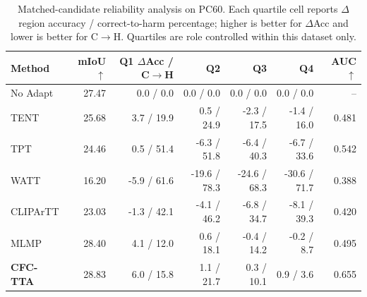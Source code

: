 \begin{table}[t]
\centering
\scriptsize
\setlength{\tabcolsep}{3.2pt}
\caption{Matched-candidate reliability analysis on PC60. Each quartile cell reports $\Delta$ region accuracy / correct-to-harm percentage; higher is better for $\Delta$Acc and lower is better for C$\rightarrow$H. Quartiles are role controlled within this dataset only.}
\label{tab:source-risk-pc60}
\begin{tabular}{lrrrrrr}
\toprule
Method & mIoU $\uparrow$ & Q1 $\Delta$Acc / C$\rightarrow$H & Q2 & Q3 & Q4 & AUC $\uparrow$ \\
\midrule
No Adapt & 27.47 & 0.0 / 0.0 & 0.0 / 0.0 & 0.0 / 0.0 & 0.0 / 0.0 & -- \\
TENT & 25.68 & 3.7 / 19.9 & 0.5 / 24.9 & -2.3 / 17.5 & -1.4 / 16.0 & 0.481 \\
TPT & 24.46 & 0.5 / 51.4 & -6.3 / 51.8 & -6.4 / 40.3 & -6.7 / 33.6 & 0.542 \\
WATT & 16.20 & -5.9 / 61.6 & -19.6 / 78.3 & -24.6 / 68.3 & -30.6 / 71.7 & 0.388 \\
CLIPArTT & 23.03 & -1.3 / 42.1 & -4.1 / 46.2 & -6.8 / 34.7 & -8.1 / 39.3 & 0.420 \\
MLMP & 28.40 & 4.1 / 12.0 & 0.6 / 18.1 & -0.4 / 14.2 & -0.2 / 8.7 & 0.495 \\
\textbf{CFC-TTA} & 28.83 & 6.0 / 15.8 & 1.1 / 21.7 & 0.3 / 10.1 & 0.9 / 3.6 & 0.655 \\
\bottomrule
\end{tabular}
\end{table}
